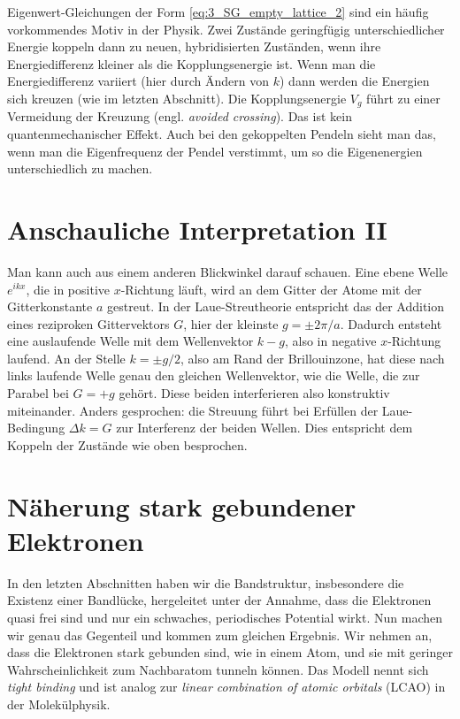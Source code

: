 Eigenwert-Gleichungen der Form \ref{eq:3_SG_empty_lattice_2} sind ein häufig vorkommendes Motiv in der Physik. Zwei Zustände geringfügig unterschiedlicher Energie koppeln dann zu neuen, hybridisierten Zuständen, wenn ihre Energiedifferenz kleiner als die Kopplungsenergie ist. Wenn man die Energiedifferenz variiert (hier durch Ändern von $k$) dann werden die Energien sich kreuzen (wie im letzten Abschnitt). Die Kopplungsenergie $V_g$ führt zu einer Vermeidung der Kreuzung (engl. \emph{avoided crossing}). Das ist kein quantenmechanischer Effekt. Auch bei den gekoppelten Pendeln sieht man das, wenn man die Eigenfrequenz der Pendel verstimmt, um so die Eigenenergien unterschiedlich zu machen.


\section*{Anschauliche Interpretation II}

Man kann auch aus einem anderen Blickwinkel darauf schauen. Eine ebene Welle $e^{i k x}$, die in positive $x$-Richtung läuft, wird an dem Gitter der Atome mit der Gitterkonstante $a$ gestreut.  In der Laue-Streutheorie entspricht das der Addition eines reziproken Gittervektors $G$, hier der kleinste $g = \pm 2 \pi /a$. Dadurch entsteht eine auslaufende Welle mit dem Wellenvektor $k - g$, also in negative $x$-Richtung laufend.  An der Stelle $k = \pm g/2$, also am Rand der Brillouinzone, hat diese nach links laufende Welle genau den gleichen Wellenvektor, wie die Welle, die zur Parabel bei $G=+g$ gehört. Diese beiden interferieren also konstruktiv miteinander. Anders gesprochen: die Streuung führt bei Erfüllen der Laue-Bedingung $\Delta k = G$ zur Interferenz der beiden Wellen. Dies entspricht dem Koppeln der Zustände wie oben besprochen.


\section*{Näherung stark gebundener Elektronen}

In den letzten Abschnitten haben wir die Bandstruktur, insbesondere die Existenz einer Bandlücke, hergeleitet unter der Annahme, dass die Elektronen quasi frei sind und nur ein schwaches, periodisches Potential wirkt. Nun machen wir genau das Gegenteil und kommen zum gleichen Ergebnis. Wir nehmen an, dass die Elektronen stark gebunden sind, wie in einem Atom, und sie mit geringer Wahrscheinlichkeit zum Nachbaratom tunneln können. Das Modell nennt sich \emph{tight binding} und ist analog zur \emph{linear combination of atomic orbitals} (LCAO) in der Molekülphysik.

